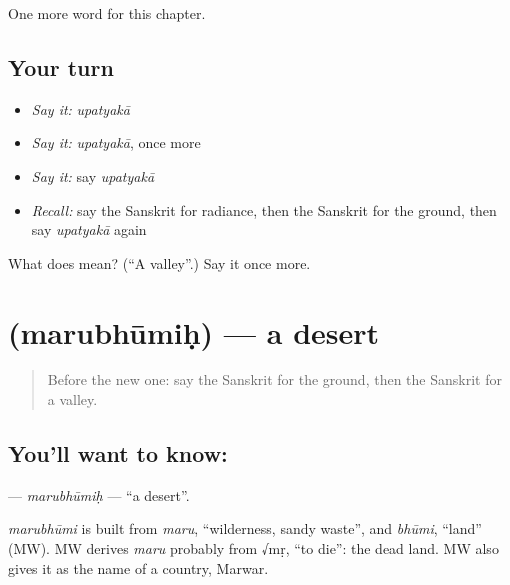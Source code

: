 \begin{grammarlens}[title={What you've built}]
One more word for this chapter.
\end{grammarlens}

\subsection*{Your turn}
\begin{itemize}
\raggedright
  \item \emph{Say it:} \emph{upatyakā}
  \item \emph{Say it:} \emph{upatyakā}, once more
  \item \emph{Say it:} say \emph{upatyakā}
  \item \emph{Recall:} say the Sanskrit for radiance, then the Sanskrit for the ground, then say \emph{upatyakā} again
\end{itemize}

\begin{tcolorbox}[breakable,colback=teal!4,colframe=teal!35!black,title={Before you move on}]
What does  mean? (\textquotedblleft{}A valley\textquotedblright{}.) Say it once more.
\end{tcolorbox}
\section[\texorpdfstring{\sk{मरुभूमिः} (marubhūmiḥ)}{मरुभूमिः (marubhūmiḥ)}]{ (marubhūmiḥ) — a desert}

\label{lesson:SA-C225-marubhumih}



\begin{quote}
Before the new one: say the Sanskrit for the ground, then the Sanskrit for a valley.
\end{quote}

\subsection*{You'll want to know: }
\textbf{} — \emph{marubhūmiḥ} — \textquotedblleft{}a desert\textquotedblright{}.

\begin{cousinweb}
\emph{marubhūmi} is built from \emph{maru}, \textquotedblleft{}wilderness, sandy waste\textquotedblright{}, and \emph{bhūmi}, \textquotedblleft{}land\textquotedblright{} (MW). MW derives \emph{maru} probably from √mṛ, \textquotedblleft{}to die\textquotedblright{}: the dead land. MW also gives it as the name of a country, Marwar.
\end{cousinweb}

